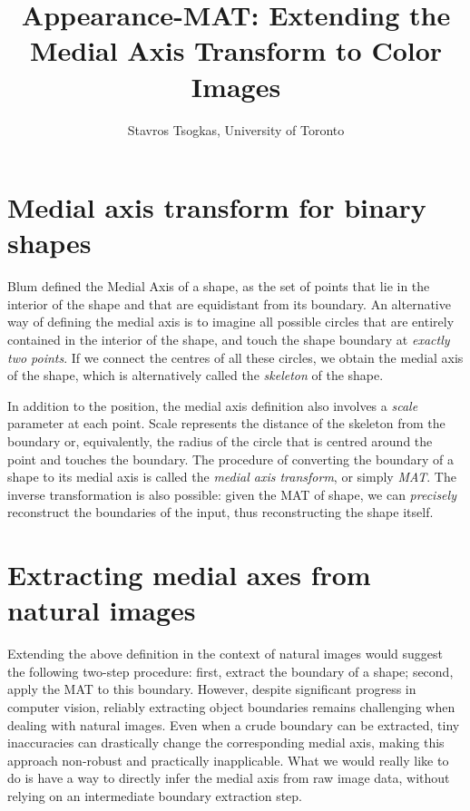 \documentclass{article}
\author{Stavros Tsogkas, University of Toronto}
\title{Appearance-MAT: Extending the Medial Axis Transform to Color Images}
\begin{document}
\maketitle

\section{Medial axis transform for binary shapes}\label{sec:mat}
Blum defined the Medial Axis of a shape, as the set of points that lie in the interior of the shape and that are equidistant from its boundary. 
An alternative way of defining the medial axis is to imagine all possible circles that are entirely contained in the interior of the shape, and touch the shape boundary at \emph{exactly two points}.
If we connect the centres of all these circles, we obtain the medial axis of the shape, which is alternatively called the \emph{skeleton} of the shape. 

In addition to the position, the medial axis definition also involves a \emph{scale} parameter at each point.
Scale represents the distance of the skeleton from the boundary or, equivalently, the radius of the circle that is centred around the point and touches the boundary.
The procedure of converting the boundary of a shape to its medial axis is called the \emph{medial axis transform}, or simply \emph{MAT}.
The inverse transformation is also possible: given the MAT of shape, we can \emph{precisely} reconstruct the boundaries of the input, thus reconstructing the shape itself.

\section{Extracting medial axes from natural images}\label{sec:colormedial}
Extending the above definition in the context of natural images would suggest the following two-step procedure:
first, extract the boundary of a shape; second, apply the MAT to this boundary.
However, despite significant progress in computer vision, reliably extracting object boundaries remains challenging
when dealing with natural images.
Even when a crude boundary can be extracted, tiny inaccuracies can drastically change the corresponding medial axis, making this approach non-robust and practically inapplicable.
What we would really like to do is have a way to directly infer the medial axis from raw image data, without relying on an intermediate boundary extraction step.
\end{document}
